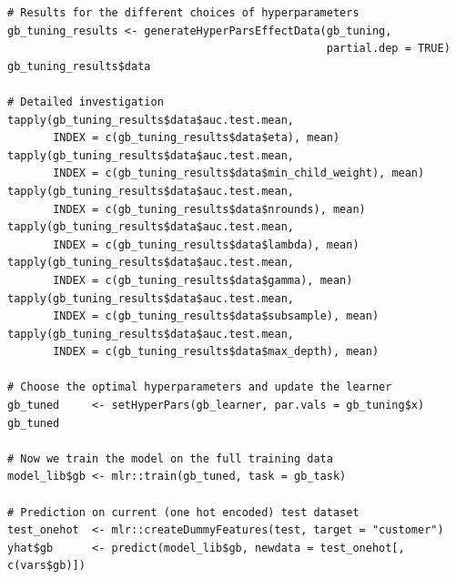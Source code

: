 \documentclass[12pt]{article}
\begin{document}
\begin{lstlisting}
# Results for the different choices of hyperparameters
gb_tuning_results <- generateHyperParsEffectData(gb_tuning, 
                                                 partial.dep = TRUE)
gb_tuning_results$data
  
# Detailed investigation
tapply(gb_tuning_results$data$auc.test.mean, 
       INDEX = c(gb_tuning_results$data$eta), mean)
tapply(gb_tuning_results$data$auc.test.mean, 
       INDEX = c(gb_tuning_results$data$min_child_weight), mean)
tapply(gb_tuning_results$data$auc.test.mean, 
       INDEX = c(gb_tuning_results$data$nrounds), mean)
tapply(gb_tuning_results$data$auc.test.mean, 
       INDEX = c(gb_tuning_results$data$lambda), mean)
tapply(gb_tuning_results$data$auc.test.mean, 
       INDEX = c(gb_tuning_results$data$gamma), mean)
tapply(gb_tuning_results$data$auc.test.mean, 
       INDEX = c(gb_tuning_results$data$subsample), mean)
tapply(gb_tuning_results$data$auc.test.mean, 
       INDEX = c(gb_tuning_results$data$max_depth), mean)

# Choose the optimal hyperparameters and update the learner
gb_tuned     <- setHyperPars(gb_learner, par.vals = gb_tuning$x)
gb_tuned

# Now we train the model on the full training data 
model_lib$gb <- mlr::train(gb_tuned, task = gb_task)

# Prediction on current (one hot encoded) test dataset
test_onehot  <- mlr::createDummyFeatures(test, target = "customer") 
yhat$gb      <- predict(model_lib$gb, newdata = test_onehot[, c(vars$gb)])
\end{lstlisting}
\end{document}
